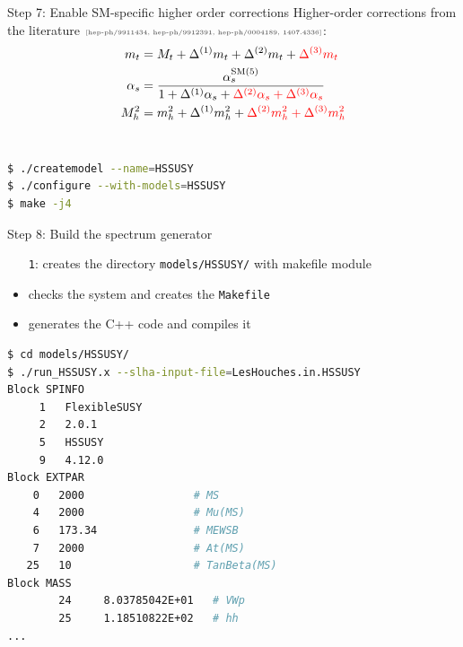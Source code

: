 \documentclass[hyperref={pdfpagelabels=false},ngerman]{beamer}
\newcommand{\mycite}[1]{\ensuremath{\text{\textcolor{darkgray}{\tiny [#1]}}}}
\newcommand{\SM}{\ensuremath{\text{SM}}}
\newcommand{\as}{\alpha_s}
\begin{document}
\begin{frame}{Step 7: Enable SM-specific higher order corrections}
  Higher-order corrections from the literature \mycite{hep-ph/9911434,
    hep-ph/9912391, hep-ph/0004189, 1407.4336}:
  \begin{align*}
    m_t &= M_t + \Delta^{(1)} m_t + \Delta^{(2)} m_t + \textcolor{red}{\Delta^{(3)} m_t} \\
    \alpha_s &= \frac{\alpha_s^{\SM(5)}}{1 + \Delta^{(1)} \as + \textcolor{red}{\Delta^{(2)} \as + \Delta^{(3)} \as}} \\
    M_h^2 &= m_h^2 + \Delta^{(1)} m_h^2 + \textcolor{red}{\Delta^{(2)} m_h^2 + \Delta^{(3)} m_h^2}
  \end{align*}
  \\[1em]
  \usebox{\listbox}
\end{frame}

\begin{lrbox}{\listbox}\begin{lstlisting}[language=bash]
$ ./createmodel --name=HSSUSY
$ ./configure --with-models=HSSUSY
$ make -j4
\end{lstlisting}\end{lrbox} %

\begin{frame}{Step 8: Build the spectrum generator}
  \usebox{\listbox}
  \\[1em]
  \begin{itemize}
  \item[\texttt{1}:] creates the directory \lstinline{models/HSSUSY/}
    with makefile module
  \item[\texttt{2}:] checks the system and creates the \lstinline{Makefile}
  \item[\texttt{3}:] generates the C++ code and compiles it
  \end{itemize}
\end{frame}

\begin{lrbox}{\listbox}\begin{lstlisting}[language=bash]
$ cd models/HSSUSY/
$ ./run_HSSUSY.x --slha-input-file=LesHouches.in.HSSUSY
Block SPINFO
     1   FlexibleSUSY
     2   2.0.1
     5   HSSUSY
     9   4.12.0
Block EXTPAR
    0   2000                 # MS
    4   2000                 # Mu(MS)
    6   173.34               # MEWSB
    7   2000                 # At(MS)
   25   10                   # TanBeta(MS)
Block MASS
        24     8.03785042E+01   # VWp
        25     1.18510822E+02   # hh
...
\end{lstlisting}\end{lrbox} %
\end{document}
